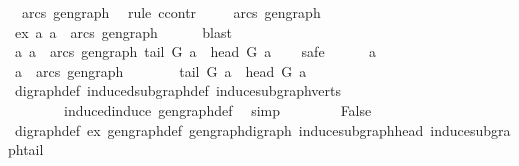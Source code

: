 \begin{isabellebody}
\ \ {\isachardoublequoteopen}arcs\ gen{\isacharunderscore}{\kern0pt}graph\ {\isacharequal}{\kern0pt}\ {\isacharbraceleft}{\kern0pt}{\isacharbraceright}{\kern0pt}{\isachardoublequoteclose}\isanewline
%
\isadelimproof
%
\endisadelimproof
%
\isatagproof
{}\isamarkupfalse%
{\isacharparenleft}{\kern0pt}rule\ ccontr{\isacharparenright}{\kern0pt}\isanewline
\ \ \isamarkupfalse%
\ {\isachardoublequoteopen}{\isasymnot}\ arcs\ gen{\isacharunderscore}{\kern0pt}graph\ {\isacharequal}{\kern0pt}\ {\isacharbraceleft}{\kern0pt}{\isacharbraceright}{\kern0pt}{\isachardoublequoteclose}\isanewline
\ \ \isamarkupfalse%
\ \isamarkupfalse%
\ ex{\isacharcolon}{\kern0pt}\ {\isachardoublequoteopen}{\isasymexists}a{\isachardot}{\kern0pt}\ a\ {\isasymin}\ {\isacharparenleft}{\kern0pt}arcs\ gen{\isacharunderscore}{\kern0pt}graph{\isacharparenright}{\kern0pt}{\isachardoublequoteclose}\isanewline
\ \ \ \ \isamarkupfalse%
\ blast\isanewline
\ \ \isamarkupfalse%
\ \isamarkupfalse%
\ {\isachardoublequoteopen}{\isasymforall}a{\isachardot}{\kern0pt}\ a\ {\isasymin}\ {\isacharparenleft}{\kern0pt}arcs\ gen{\isacharunderscore}{\kern0pt}graph{\isacharparenright}{\kern0pt}{\isasymlongrightarrow}\ tail\ G\ a\ {\isacharequal}{\kern0pt}\ head\ G\ a{\isachardoublequoteclose}\isanewline
\ \ \isamarkupfalse%
\ safe\isanewline
\ \ \ \ \isamarkupfalse%
\ a\isanewline
\ \ \ \ \isamarkupfalse%
\ {\isachardoublequoteopen}a\ {\isasymin}\ arcs\ gen{\isacharunderscore}{\kern0pt}graph{\isachardoublequoteclose}\isanewline
\ \ \ \ \isamarkupfalse%
\ \isamarkupfalse%
\ {\isachardoublequoteopen}tail\ G\ a\ {\isacharequal}{\kern0pt}\ head\ G\ a{\isachardoublequoteclose}\isanewline
\ \ \ \ \ \ \isamarkupfalse%
\ digraph{\isacharunderscore}{\kern0pt}def\ induced{\isacharunderscore}{\kern0pt}subgraph{\isacharunderscore}{\kern0pt}def\ induce{\isacharunderscore}{\kern0pt}subgraph{\isacharunderscore}{\kern0pt}verts\isanewline
\ \ \ \ \ \ \ \ induced{\isacharunderscore}{\kern0pt}induce\ gen{\isacharunderscore}{\kern0pt}graph{\isacharunderscore}{\kern0pt}def\ \isamarkupfalse%
\ simp\isanewline
\ \ \isamarkupfalse%
\isanewline
\ \ \isamarkupfalse%
\ \isamarkupfalse%
\ False\isanewline
\ \ \ \ \isamarkupfalse%
\ digraph{\isacharunderscore}{\kern0pt}def\ ex\ gen{\isacharunderscore}{\kern0pt}graph{\isacharunderscore}{\kern0pt}def\ gen{\isacharunderscore}{\kern0pt}graph{\isacharunderscore}{\kern0pt}digraph\ induce{\isacharunderscore}{\kern0pt}subgraph{\isacharunderscore}{\kern0pt}head\ induce{\isacharunderscore}{\kern0pt}subgraph{\isacharunderscore}{\kern0pt}tail\ \isanewline

\end{isabellebody}
